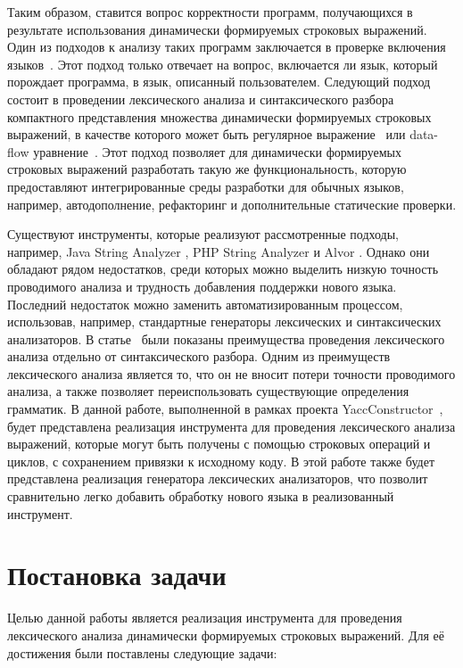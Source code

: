 \documentclass{matmex-diploma}
\begin{document}
Таким образом, ставится вопрос корректности программ, получающихся в результате использования динамически формируемых строковых выражений. Один из подходов к анализу таких программ заключается в проверке включения языков~\cite{JSA, PHPSA}. Этот подход только отвечает на вопрос, включается ли язык, который порождает программа, в язык, описанный пользователем. Следующий подход состоит в проведении лексического анализа и синтаксического разбора компактного представления множества динамически формируемых строковых выражений, в качестве которого может быть регулярное выражение~\cite{Alvor} или data-flow уравнение~\cite{Doh}. Этот подход позволяет для динамически формируемых строковых выражений разработать такую же функциональность, которую предоставляют интегрированные среды разработки для обычных языков, например, автодополнение, рефакторинг и дополнительные статические проверки.

Существуют инструменты, которые реализуют рассмотренные подходы, например, Java String Analyzer \cite{JSA}, PHP String Analyzer \cite{PHPSA} и Alvor \cite{Alvor}. Однако они обладают рядом недостатков, среди которых можно выделить низкую точность проводимого анализа и трудность добавления поддержки нового языка. Последний недостаток можно заменить автоматизированным процессом, использовав, например, стандартные генераторы лексических и синтаксических анализаторов. В статье~\cite{LexerAdv} были показаны преимущества проведения лексического анализа отдельно от синтаксического разбора. Одним из преимуществ лексического анализа является то, что он не вносит потери точности проводимого анализа, а также позволяет переиспользовать существующие определения грамматик. В данной работе, выполненной в рамках проекта YaccConstructor~\cite{YC_article}, будет представлена реализация инструмента для проведения лексического анализа выражений, которые могут быть получены с помощью строковых операций и циклов, с сохранением привязки к исходному коду. В этой работе также будет представлена реализация генератора лексических анализаторов, что позволит сравнительно легко добавить обработку нового языка в реализованный инструмент.


\section{Постановка задачи}
Целью данной работы является реализация инструмента для проведения лексического анализа динамически формируемых строковых выражений. Для её достижения были поставлены следующие задачи:
\end{document}
